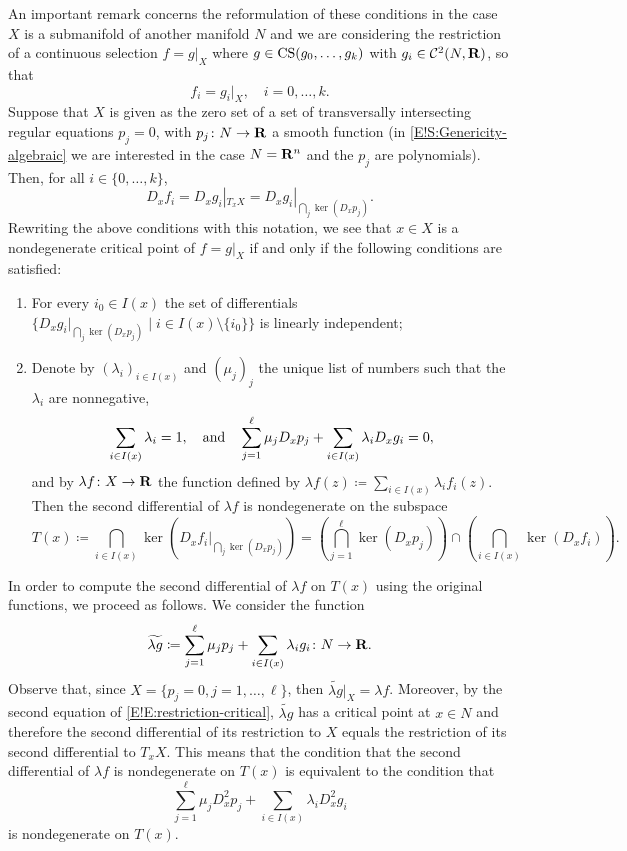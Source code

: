 \begin{remark}
\label{E!remark:restriction}
  An important remark concerns the reformulation of these conditions in the case $X$ is a submanifold of another manifold $N$ and we are considering the restriction of a continuous selection $f = g|_X$ where $g \in \operatorname{CS}(g_0, \ldots, g_k)$ with $g_i \in \mathcal{C}^2(N, \mathbf{R})$, so that
  \[
    f_i = g_i|_{X}, \quad i = 0, \ldots, k.
  \]
  Suppose that $X$ is given as the zero set of a set of transversally intersecting regular equations $p_j = 0$, with $p_j \colon N \to \mathbf{R}$ a smooth function (in \cref{E!S:Genericity-algebraic} we are interested in the case $N = \mathbf{R}^n$ and the $p_j$ are polynomials). Then, for all $i \in \{0, \ldots, k\}$,
  \[
    D_x f_i = D_x g_i|_{T_x X} = D_x g_i|_{\bigcap_j \ker(D_x p_j)}.
  \]
  Rewriting the above conditions with this notation, we see that $x \in X$ is a nondegenerate critical point of $f = g|_X$ if and only if the following conditions are satisfied:
  \begin{enumerate}
  \item
    For every $i_0 \in I(x)$ the set of differentials $\{D_x g_i|_{\bigcap_j \ker(D_x p_j)} \mid i \in I(x) \setminus \{i_0\}\}$ is linearly independent;
  \item
  \label{E!i:degen2}
    Denote by $(\lambda_i)_{i\in I(x)}$ and $(\mu_j)_j$ the unique list of numbers such that the $\lambda_i$ are nonnegative,
    \begin{equation}
    \label{E!E:restriction-critical}
      \sum_{i \in I(x)} \lambda_i = 1,
      \quad \textnormal{and} \quad
      \sum_{j = 1}^\ell \mu_j D_x p_j + \sum_{i \in I(x)} \lambda_i D_x g_i = 0,
    \end{equation}
    and by $\lambda f \colon X\to \mathbf{R}$ the function defined by $\lambda f(z) \coloneq \sum_{i \in I(x)} \lambda_i f_i(z)$. Then the second differential of $\lambda f$ is nondegenerate on the subspace
    \[
      T(x) \coloneq \bigcap_{i\in I(x)} \ker(D_x f_i|_{\bigcap_j \ker(D_x p_j)}) = \left( \bigcap_{j = 1}^\ell \ker(D_x p_j) \right) \cap \left( \bigcap_{i \in I(x)} \ker(D_x f_i) \right).
    \]
  \end{enumerate}
  In order to compute the second differential of $\lambda f$ on $T(x)$ using the original functions, we proceed as follows. We consider the function
  \[
    \widetilde{\lambda g} \coloneq \sum_{j = 1}^\ell \mu_j p_j + \sum_{i\in I(x)} \lambda_i g_i \colon N \to \mathbf{R}.
  \]
  Observe that, since $X = \{p_j = 0, j = 1, \ldots, \ell\}$, then $\widetilde{\lambda g}|_{X} = \lambda f$. Moreover, by the second equation of \eqref{E!E:restriction-critical}, $\widetilde{\lambda g}$ has a critical point at $x \in N$ and therefore the second differential of its restriction to $X$ equals the restriction of its second differential to $T_x X$. This means that the condition that the second differential of $\lambda f$ is nondegenerate on $T(x)$ is equivalent to the condition that
  \[
    \sum_{j = 1}^\ell \mu_j D_x^2 p_j + \sum_{i \in I(x)} \lambda_i D_x^2 g_i
  \]
  is nondegenerate on $T(x)$.
\end{remark}

